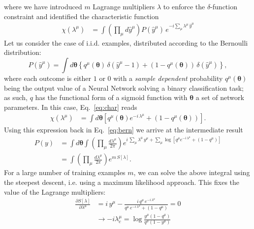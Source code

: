 \documentclass{article}
\begin{document}
%
where we have introduced $m$ Lagrange multipliers $\lambda$ to enforce the $\delta$-function constraint and identified  the characteristic function
%
\begin{align} \label{eq:char}
 \chi(\lambda^{\mu}) &=  \int  \left( \prod_{\mu} d\hat{y}^{\mu} \right)  P(\hat{y}^{\mu} )  \, e^{-i \sum_{\mu} \lambda^{\mu} \, \hat{y}^{\mu}}
 \end{align}
%
Let us consider the case of i.i.d. examples, distributed according to the Bernoulli distribution:
%
\begin{equation} \label{eq:bern}
P(\hat{y}^{\mu} ) = \int d\boldsymbol{\theta} \left\{ q^{\mu}(\boldsymbol{\theta}) \, \delta(\hat{y}^{\mu}-1 ) + (1-q^{\mu}(\boldsymbol{\theta}) ) \, \delta(\hat{y}^{\mu}) \right\},
\end{equation}
%
where each outcome is either $1$ or $0$ with a {\it sample dependent} probability $q^{\mu}(\boldsymbol{\theta})$ being the output value of a Neural Network solving a binary classification task; as such, $q$ has the functional form of a sigmoid function with $\boldsymbol{\theta}$ a set of network parameters. In this case, Eq.~\eqref{eq:char} reads
\begin{align} \label{eq:char}
 \chi(\lambda^{\mu}) &=  \int  d\boldsymbol{\theta} \left[ q^{\mu}(\boldsymbol{\theta} ) e^{-i \, \lambda^{\mu} } +(1-q^{\mu}(\boldsymbol{\theta} )) \right].
 \end{align}
%
Using this expression back in Eq.~\eqref{eq:bern} we arrive at the intermediate result
%
 \begin{align} \label{eq:cl2}
 P(y) &= \int d\boldsymbol{\theta} \int  \left( \prod_{\mu}  \frac{d\lambda^{\mu}}{2\pi} \right) e^{i \, \sum_{\mu} \lambda^{\mu} \, y^{\mu} +\sum_{\mu} \log \left[ q^{\mu} e^{-i \, \lambda^{\mu} } +(1-q^{\mu}) \right] }  \\ \nonumber
 &=  \int  \left( \prod_{\mu}  \frac{d\lambda^{\mu}}{2\pi} \right) e^{m \, S[\lambda]}.
 \end{align}
%
For a large number of training examples $m$, we can solve the above integral using the steepest descent, i.e. using a maximum likelihood approach. This fixes the value of the Lagrange multipliers:
%
\begin{align} \label{eq:cl3}
\frac{\partial S[\lambda]}{\partial \lambda^{\mu}} &= i \, y^{\mu} - \frac{i \, q^{\mu} \, e^{-i \, \lambda^{\mu}}}{q^{\mu} \, e^{-i \, \lambda^{\mu}} + (1-q^{\mu})} = 0 \\ \nonumber
&\rightarrow - i \lambda^{\mu}_{c} =  \log \frac{y^{\mu}(1-q^{\mu}) }{q^{\mu}(1- y^{\mu})}
\end{align}
\end{document}
